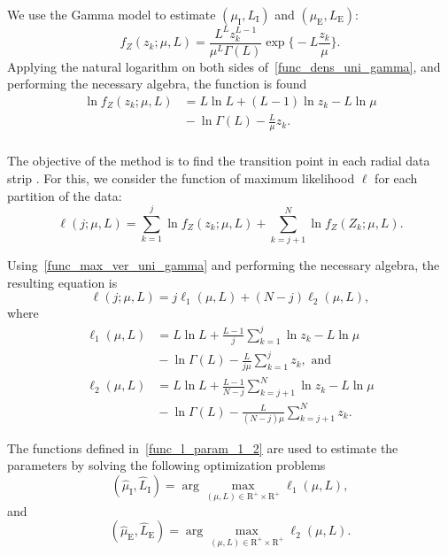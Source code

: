 \documentclass[journal]{IEEEtran}
\begin{document}
We use the Gamma model to estimate $(\mu_\text{I},L_\text{I})$ and $(\mu_\text{E},L_\text{E})$:
\begin{equation}\label{func_dens_uni_gamma}
	f_Z(z_k;\mu,L)=\frac{L^{L}z_k^{L-1}}{\mu^{L}\Gamma(L)} \exp\Big\{-L\frac{z_k}{\mu}\Big\}.
\end{equation}
Applying the natural logarithm on both sides of~\eqref{func_dens_uni_gamma}, and performing  the necessary algebra,  the function is found
\begin{equation}\label{func_max_ver_uni_gamma}
\begin{split}
	\ln f_Z(z_k;\mu,L)&= L\ln L +(L - 1) \ln z_k-L \ln \mu \\
	 	                  &{}- \ln \Gamma(L) -\frac{L}{\mu} z_k.\\
\end{split}
\end{equation}

The objective of the method is to find the transition point in each radial data strip .
For this, we consider the function of maximum likelihood $\ell$ for each partition of the data:
\begin{equation}\nonumber
\ell(j;\mu, L)=\sum_{k=1}^{j}\ln f_{Z}(z_k;\mu,L)
             +\sum_{k=j+1}^{N}\ln f_{Z}(Z_k;\mu,L).
\end{equation}
 
Using~\eqref{func_max_ver_uni_gamma} and performing the necessary algebra, the resulting equation is 
\begin{equation}\label{func_l_param}
  \ell(j;\mu, L)=j\ell_1(\mu, L) + (N - j)\ell_2(\mu, L),
 \end{equation}
where
\begin{equation}\label{func_l_param_1_2}
\begin{split}
    \ell_1(\mu, L)&=L\ln L+\frac{L-1}{j}\sum_{k=1}^{j}\ln z_k-L\ln\mu\\
    &{}-\ln\Gamma(L) -\frac{L}{j\mu}\sum_{k=1}^{j} z_k,\text{ and}\\
    \ell_2(\mu, L)&=L\ln L+\frac{L-1}{N-j}\sum_{k=j+1}^{N}\ln z_k-L\ln\mu\\
    &{}-\ln\Gamma(L) -\frac{L}{(N-j)\mu}\sum_{k=j+1}^{N} z_k.
 \end{split}
\end{equation}
 
The functions defined in~\eqref{func_l_param_1_2} are used to estimate the parameters by solving the following optimization problems 
\begin{equation}\label{optimiz_l_1}
(\widehat{\mu}_\text{I},\widehat{L}_\text{I})= \arg\max\limits_{(\mu,L)\in \mathrm{R}^{+}\times\mathrm{R}^{+}}\ell_1(\mu,L),
\end{equation}
and
\begin{equation}\label{optimiz_l_2}
(\widehat{\mu}_\text{E},\widehat{L}_\text{E})= \arg\max\limits_{(\mu,L)\in \mathrm{R}^{+}\times\mathrm{R}^{+}}\ell_2(\mu,L).
\end{equation} 
\end{document}
